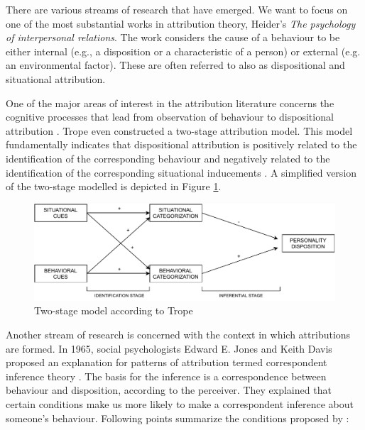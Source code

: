 There are various streams of research that have emerged.  We want to focus on one of the most substantial works in attribution theory, Heider's \textit{The psychology of interpersonal relations}. The work considers the cause of a behaviour to be either internal (e.g., a disposition or a characteristic of a person) or external (e.g. an environmental factor). These are often referred to also as dispositional and situational attribution. 

One of the major areas of interest in the attribution literature concerns the cognitive processes that lead from observation of behaviour to dispositional attribution \cite{Trope1989}. Trope even constructed a two-stage attribution model. This model fundamentally indicates that dispositional attribution is positively related to the identification of the corresponding behaviour and negatively related to the identification of the corresponding situational inducements \cite{Trope1986}. A simplified version of the two-stage modelled is depicted in Figure \ref{fig:twoStageModel}.

\begin{figure}
  \includegraphics[width=\linewidth]{figures/TwoStageModel.pdf}
  \caption{Two-stage model according to Trope \cite{Trope1986}}
  \label{fig:twoStageModel}
\end{figure}

Another stream of research is concerned with the context in which attributions are formed.  In 1965, social psychologists Edward E. Jones and Keith Davis proposed an explanation for patterns of attribution termed correspondent inference theory \cite{Jones1965}. The basis for the inference is a correspondence between behaviour and disposition, according to the perceiver. They explained that certain conditions make us more likely to make a correspondent inference about someone's behaviour. Following points summarize the conditions proposed by \cite{Jones1965}:

